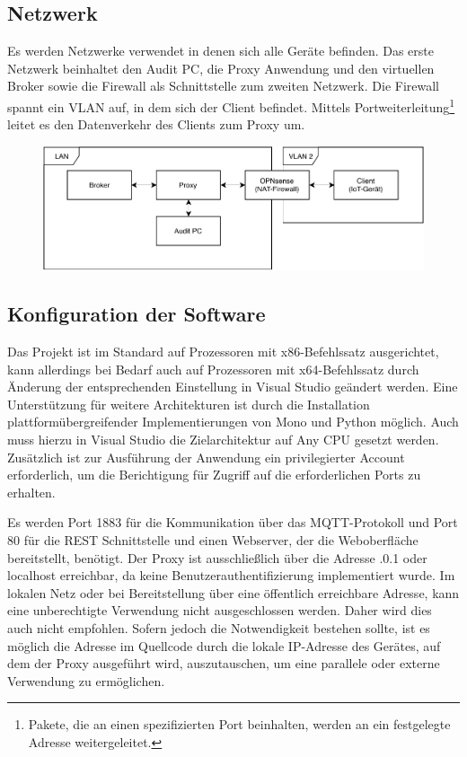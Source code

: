     \subsection{Netzwerk}
    Es werden Netzwerke verwendet in denen sich alle Geräte befinden. 
    Das erste Netzwerk beinhaltet den Audit PC, die Proxy Anwendung und den virtuellen Broker sowie die Firewall als Schnittstelle zum zweiten Netzwerk.
    Die Firewall spannt ein \ac{VLAN} auf, in dem sich der Client befindet. Mittels Portweiterleitung\footnote{Pakete, die an einen spezifizierten Port beinhalten, werden an ein festgelegte Adresse weitergeleitet.} leitet es den Datenverkehr des Clients zum Proxy um. %
    
    \begin{figure}[h]%
        \centering
        \includegraphics[width=14cm]{tex/bilder/6_validierung/Netzwerkdiagramm.pdf}
        \label{fig:virtuelles_netzwerk}
    \end{figure}
    
    \subsection{Konfiguration der Software} \label{KonfigurationDerSoftware}
    Das Projekt ist im Standard auf Prozessoren mit x86-Befehlssatz ausgerichtet, kann allerdings bei Bedarf auch auf Prozessoren mit x64-Befehlssatz durch Änderung der entsprechenden Einstellung in Visual Studio geändert werden.
    Eine Unterstützung für weitere Architekturen ist durch die Installation plattformübergreifender Implementierungen von Mono und Python möglich. Auch muss hierzu in Visual Studio die Zielarchitektur auf \glqq Any CPU\grqq{} gesetzt werden. 
    Zusätzlich ist zur Ausführung der Anwendung ein privilegierter Account erforderlich, um die Berichtigung für Zugriff auf die erforderlichen Ports zu erhalten.
    
    Es werden Port 1883 für die Kommunikation über das \ac{MQTT}-Protokoll und Port 80 für die \ac{REST} Schnittstelle und einen Webserver, der die Weboberfläche bereitstellt, benötigt.
    Der Proxy ist ausschließlich über die Adresse .0.1\grqq{} oder \glqq localhost\grqq{} erreichbar, da keine Benutzerauthentifizierung implementiert wurde. Im lokalen Netz oder bei Bereitstellung über eine öffentlich erreichbare Adresse, kann eine unberechtigte Verwendung nicht ausgeschlossen werden. Daher wird dies auch nicht empfohlen. Sofern jedoch die Notwendigkeit bestehen sollte, ist es möglich die Adresse im Quellcode durch die lokale IP-Adresse des Gerätes, auf dem der Proxy ausgeführt wird, auszutauschen, um eine parallele oder externe Verwendung zu ermöglichen.


